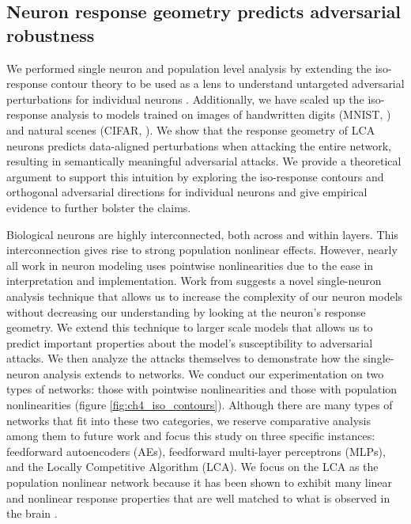 \subsection{Neuron response geometry predicts adversarial robustness}\label{sec:ch4_neuron}
We performed single neuron and population level analysis by extending the iso-response contour theory to be used as a lens to understand untargeted adversarial perturbations for individual neurons \parencite{golden2016conjectures,vilankar2017selectivity}. Additionally, we have scaled up the iso-response analysis to models trained on images of handwritten digits (MNIST, \cite{lecun1998mnist}) and natural scenes (CIFAR, \cite{krizhevsky2009learning}). We show that the response geometry of LCA neurons predicts data-aligned perturbations when attacking the entire network, resulting in semantically meaningful adversarial attacks. We provide a theoretical argument to support this intuition by exploring the iso-response contours and orthogonal adversarial directions for individual neurons and give empirical evidence to further bolster the claims. 

Biological neurons are highly interconnected, both across and within layers. This interconnection gives rise to strong population nonlinear effects. However, nearly all work in neuron modeling uses pointwise nonlinearities due to the ease in interpretation and implementation. Work from \parencite{golden2016conjectures} suggests a novel single-neuron analysis technique that allows us to increase the complexity of our neuron models without decreasing our understanding by looking at the neuron’s response geometry. We extend this technique to larger scale models that allows us to predict important properties about the model’s susceptibility to adversarial attacks. We then analyze the attacks themselves to demonstrate how the single-neuron analysis extends to networks. We conduct our experimentation on two types of networks: those with pointwise nonlinearities and those with population nonlinearities (figure \ref{fig:ch4_iso_contours}). Although there are many types of networks that fit into these two categories, we reserve comparative analysis among them to future work and focus this study on three specific instances: feedforward autoencoders (AEs), feedforward multi-layer perceptrons (MLPs), and the Locally Competitive Algorithm (LCA). We focus on the LCA as the population nonlinear network because it has been shown to exhibit many linear and nonlinear response properties that are well matched to what is observed in the brain \parencite{zhu2013visual, olshausen1997sparse}.

